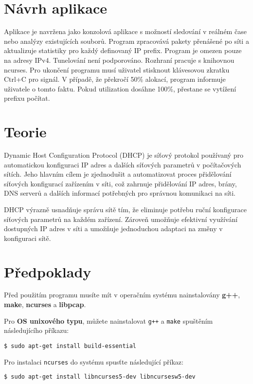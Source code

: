 \documentclass[a4paper, 11pt]{article}
\begin{document}
    \section{Návrh aplikace}
    Aplikace je navržena jako konzolová aplikace s možností sledování v reálném čase nebo analýzy existujících souborů. Program zpracovává pakety přenášené po síti a aktualizuje statistiky pro každý definovaný IP prefix. Program je omezen pouze na adresy IPv4. Tunelování není podporováno. Rozhraní pracuje s knihovnou ncurses. Pro ukončení programu musí uživatel stisknout klávesovou zkratku Ctrl+C pro signál. V případě, že překročí 50\% alokací, program informuje uživatele o tomto faktu. Pokud utilization dosáhne 100\%, přestane se vytížení prefixu počítat.

    \section{Teorie}
    Dynamic Host Configuration Protocol (DHCP) je síťový protokol používaný pro automatickou konfiguraci IP adres a dalších síťových parametrů v počítačových sítích. Jeho hlavním cílem je zjednodušit a automatizovat proces přidělování síťových konfigurací zařízením v síti, což zahrnuje přidělování IP adres, brány, DNS serverů a dalších informací potřebných pro správnou komunikaci na síti.

    DHCP výrazně usnadňuje správu sítě tím, že eliminuje potřebu ruční konfigurace síťových parametrů na každém zařízení. Zároveň umožňuje efektivní využívání dostupných IP adres v síti a umožňuje jednoduchou adaptaci na změny v konfiguraci sítě.

    \section{Předpoklady}

    Před použitím programu musíte mít v operačním systému nainstalovány \textbf{g++}, \textbf{make}, \textbf{ncurses} a \textbf{libpcap}.

    Pro \textbf{OS unixového typu}, můžete nainstalovat \texttt{g++} a \texttt{make} spuštěním následujícího příkazu:

    \begin{lstlisting}
$ sudo apt-get install build-essential
    \end{lstlisting}

    Pro instalaci \texttt{ncurses} do systému spusťte následující příkaz:

    \begin{lstlisting}[language=bash]
$ sudo apt-get install libncurses5-dev libncursesw5-dev
    \end{lstlisting}
\end{document}
